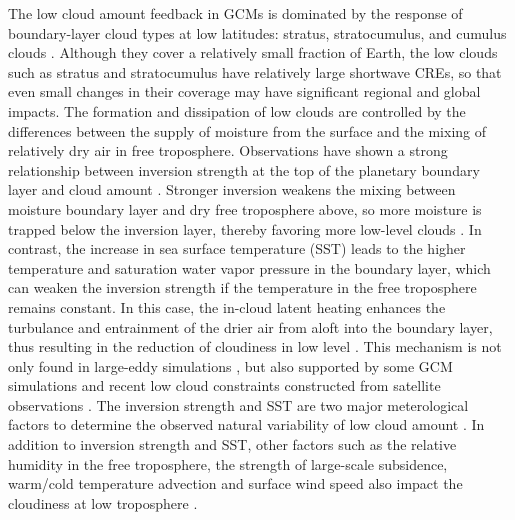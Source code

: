 The low cloud amount feedback in GCMs is dominated by the response of boundary-layer cloud types at low latitudes: stratus, stratocumulus, and cumulus clouds \citep{Ceppi2017}. Although they cover a relatively small fraction of Earth, the low clouds such as stratus and stratocumulus have relatively large shortwave CREs, so that even small changes in their coverage may have significant regional and global impacts. The formation and dissipation of low clouds are controlled by the differences between the supply of moisture from the surface and the mixing of relatively dry air in free troposphere. Observations have shown a strong relationship between inversion strength at the top of the planetary boundary layer and cloud amount \citep{Gordon1992,Klein1993,Wood2006}. Stronger inversion weakens the mixing between moisture boundary layer and dry free troposphere above, so more moisture is trapped below the inversion layer, thereby favoring more low-level clouds \citep[e.g.,][]{Qu2014,Scott2020}. In contrast, the increase in sea surface temperature (SST) leads to the higher temperature and saturation water vapor pressure in the boundary layer, which can weaken the inversion strength if the temperature in the free troposphere remains constant. In this case, the in-cloud latent heating enhances the turbulance and entrainment of the drier air from aloft into the boundary layer, thus resulting in the reduction of cloudiness in low level \citep[e.g.,][]{Rieck2012, Webb2013coupling, Qu2014, Bretherton2015, Brient2016,Myers2016,Ceppi2017relationship,Scott2020}. This mechanism is not only found in large-eddy simulations \citep{Bretherton2015}, but also supported by some GCM simulations \citep[e.g.,][]{Zhang2013CGILS,Myers2016} and recent low cloud constraints constructed from satellite observations \citep{Scott2020,Myers2021}. The inversion strength and SST are two major meterological factors to determine the observed natural variability of low cloud amount \citep[e.g.,][]{Zhou2016}. In addition to inversion strength and SST, other factors such as the relative humidity in the free troposphere, the strength of large-scale subsidence, warm/cold temperature advection and surface wind speed also impact the cloudiness at low troposphere \citep[e.g.,][]{Bretherton2015,Scott2020}.
